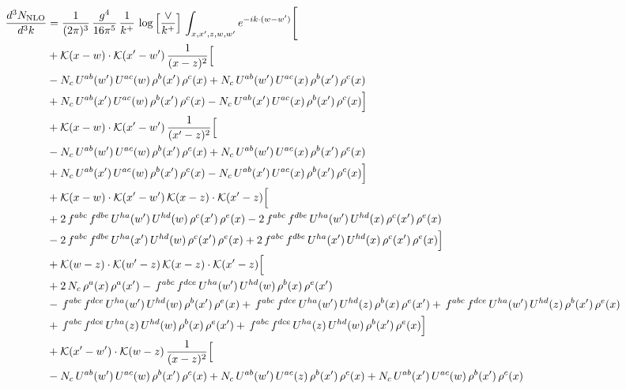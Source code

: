 \documentclass[9pt]{article}
\numberwithin{equation}{section}
\begin{document}
\begin{align}
\frac{d^{3}N_{\mathrm{NLO}}}{d^{3}k} & = \frac{1}{(2\pi)^{3}}\,\frac{g^{4}}{16\pi^{5}}\,\frac{1}{k^{+}}\,\log\Big[\frac{\vee}{k^{+}}\Big]\,\int_{x,x',z,w,w'}e^{-ik\cdot(w-w')}\Bigg[ \notag\\
& +\mathcal{K}(x-w)\cdot\mathcal{K}(x'-w')\,\frac{1}{(x-z)^{2}}\Big[\notag\\
& -N_{c}\,U^{ab}(w')\,U^{ac}(w)\,\rho^{b}(x')\,\rho^{c}(x) +N_{c}\,U^{ab}(w')\,U^{ac}(x)\,\rho^{b}(x')\,\rho^{c}(x)\notag\\
& +N_{c}\,U^{ab}(x')\,U^{ac}(w)\,\rho^{b}(x')\,\rho^{c}(x) -N_{c}\,U^{ab}(x')\,U^{ac}(x)\,\rho^{b}(x')\,\rho^{c}(x)\Big]\notag\\
& +\mathcal{K}(x-w)\cdot\mathcal{K}(x'-w')\,\frac{1}{(x'-z)^{2}}\Big[\notag\\
& -N_{c}\,U^{ab}(w')\,U^{ac}(w)\,\rho^{b}(x')\,\rho^{c}(x) +N_{c}\,U^{ab}(w')\,U^{ac}(x)\,\rho^{b}(x')\,\rho^{c}(x)\notag\\
& +N_{c}\,U^{ab}(x')\,U^{ac}(w)\,\rho^{b}(x')\,\rho^{c}(x) -N_{c}\,U^{ab}(x')\,U^{ac}(x)\,\rho^{b}(x')\,\rho^{c}(x)\Big]\notag\\
& +\mathcal{K}(x-w)\cdot\mathcal{K}(x'-w')\,\mathcal{K}(x-z)\cdot\mathcal{K}(x'-z)\Big[\notag\\
& +2\,f^{abc}\,f^{dbe}\,U^{ha}(w')\,U^{hd}(w)\,\rho^{c}(x')\,\rho^{e}(x) -2\,f^{abc}\,f^{dbe}\,U^{ha}(w')\,U^{hd}(x)\,\rho^{c}(x')\,\rho^{e}(x)\notag\\
& -2\,f^{abc}\,f^{dbe}\,U^{ha}(x')\,U^{hd}(w)\,\rho^{c}(x')\,\rho^{e}(x) +2\,f^{abc}\,f^{dbe}\,U^{ha}(x')\,U^{hd}(x)\,\rho^{c}(x')\,\rho^{e}(x)\Big]\notag\\
& +\mathcal{K}(w-z)\cdot\mathcal{K}(w'-z)\,\mathcal{K}(x-z)\cdot\mathcal{K}(x'-z)\Big[\notag\\
& +2\,N_{c}\,\rho^{a}(x)\,\rho^{a}(x') -\,f^{abc}\,f^{dce}\,U^{ha}(w')\,U^{hd}(w)\,\rho^{b}(x)\,\rho^{e}(x')\notag\\
& -\,f^{abc}\,f^{dce}\,U^{ha}(w')\,U^{hd}(w)\,\rho^{b}(x')\,\rho^{e}(x) +\,f^{abc}\,f^{dce}\,U^{ha}(w')\,U^{hd}(z)\,\rho^{b}(x)\,\rho^{e}(x') +\,f^{abc}\,f^{dce}\,U^{ha}(w')\,U^{hd}(z)\,\rho^{b}(x')\,\rho^{e}(x)\notag\\
& +\,f^{abc}\,f^{dce}\,U^{ha}(z)\,U^{hd}(w)\,\rho^{b}(x)\,\rho^{e}(x') +\,f^{abc}\,f^{dce}\,U^{ha}(z)\,U^{hd}(w)\,\rho^{b}(x')\,\rho^{e}(x)\Big]\notag\\
& +\mathcal{K}(x'-w')\cdot\mathcal{K}(w-z)\,\frac{1}{(x-z)^{2}}\Big[\notag\\
& -N_{c}\,U^{ab}(w')\,U^{ac}(w)\,\rho^{b}(x')\,\rho^{c}(x) +N_{c}\,U^{ab}(w')\,U^{ac}(z)\,\rho^{b}(x')\,\rho^{c}(x) +N_{c}\,U^{ab}(x')\,U^{ac}(w)\,\rho^{b}(x')\,\rho^{c}(x)\notag\\

\end{align}
\end{document}

